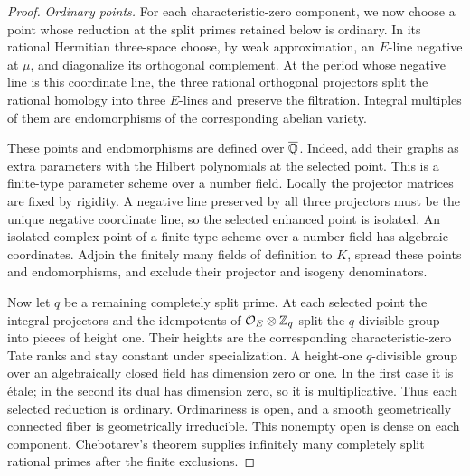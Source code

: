 \begin{proof}
\emph{Ordinary points.}
For each characteristic-zero component, we now choose a point whose
reduction at the split primes retained below is ordinary.  In its
rational Hermitian three-space choose, by weak approximation, an \(E\)-line
negative at \(\mu\), and diagonalize its orthogonal complement.
At the period whose negative line is this coordinate line, the three
rational orthogonal projectors split the rational homology
into three \(E\)-lines and preserve the filtration.  Integral
multiples of them are endomorphisms of the corresponding abelian
variety.

These points and endomorphisms are defined over \(\overline{\mathbb{Q}}\).  Indeed,
add their graphs as extra parameters with the Hilbert polynomials
at the selected point.  This is a finite-type parameter scheme over
a number field.  Locally the projector matrices are fixed by
rigidity.  A negative line preserved by all three projectors must
be the unique negative coordinate line, so the selected enhanced
point is isolated.  An isolated complex point of a finite-type
scheme over a number field has algebraic coordinates.  Adjoin the
finitely many fields of definition to \(K\), spread these points
and endomorphisms, and exclude their projector and isogeny
denominators.

Now let \(q\) be a remaining completely split prime.  At each
selected point the integral projectors and the idempotents of
\(\mathcal O_E\otimes\mathbb{Z}_q\) split the \(q\)-divisible group into
pieces of height one.  Their heights are the corresponding
characteristic-zero Tate ranks and stay constant under specialization.
A height-one \(q\)-divisible group over an algebraically closed
field has dimension zero or one.  In the first case it is étale;
in the second its dual has dimension zero, so it is multiplicative.
Thus each selected reduction is ordinary.  Ordinariness is open,
and a smooth geometrically connected fiber is geometrically
irreducible.  This nonempty open is dense on each component.
Chebotarev's theorem supplies infinitely many completely split
rational primes after the finite exclusions.
\end{proof}

